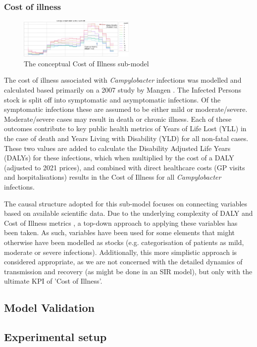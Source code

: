 \subsubsection*{Cost of illness}
\begin{figure}[h]
\caption{The conceptual Cost of Illness sub-model}
\centering
\includegraphics[width=0.5\textwidth]{images/testimage1.png}
\end{figure}
The cost of illness associated with \textit{Campylobacter} infections was modelled and calculated based primarily on a 2007 study by Mangen \parencite{mangen_campylobacteriosis_2007}. The Infected Persons stock is split off into symptomatic and asymptomatic infections. Of the symptomatic infections these are assumed to be either mild or moderate/severe. Moderate/severe cases may result in death or chronic illness. Each of these outcomes contribute to key public health metrics of Years of Life Lost (YLL) in the case of death and Years Living with Disability (YLD) for all non-fatal cases. These two values are added to calculate the Disability Adjusted Life Years (DALYs) for these infections, which when multiplied by the cost of a DALY (adjusted to 2021 prices), and combined with direct healthcare costs (GP visits and hospitalisations) results in the Cost of Illness for all \textit{Campylobacter} infections.

The causal structure adopted for this sub-model focuses on connecting variables based on available scientific data. Due to the underlying complexity of DALY and Cost of Illness metrics \parencite{jo_cost--illness_2014}, a top-down approach to applying these variables has been taken. As such, variables have been used for some elements that might otherwise have been modelled as stocks (e.g. categorisation of patients as mild, moderate or severe infections). Additionally, this more simplistic approach is considered appropriate, as we are not concerned with the detailed dynamics of transmission and recovery (as might be done in an SIR model), but only with the ultimate KPI of 'Cost of Illness'.

\subsection{Model Validation}
    
\subsection{Experimental setup}



